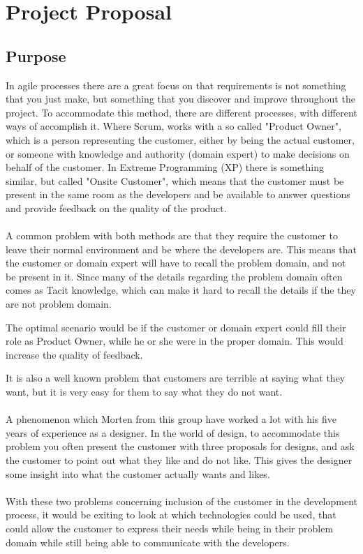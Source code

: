 \section{Project Proposal}
\subsection{Purpose}
In agile processes there are a great focus on that requirements is not something that you just make, but something that you discover and improve throughout the project.
To accommodate this method, there are different processes, with different ways of accomplish it. 
Where Scrum, works with a so called "Product Owner", which is a person representing the customer, either by being the actual customer, or someone with knowledge and authority (domain expert) to make decisions on behalf of the customer. 
In Extreme Programming (XP) there is something similar, but called "Onsite Customer", which means that the customer must be present in the same room as the developers and be available to answer questions and provide feedback on the quality of the product. 
\\\\
A common problem with both methods are that they require the customer to leave their normal environment and be where the developers are. 
This means that the customer or domain expert will have to recall the problem domain, and not be present in it.
Since many of the details regarding the problem domain often comes as Tacit knowledge, which can make it hard to recall the details if the they are not problem domain. 

The optimal scenario would be if the customer or domain expert could fill their role as Product Owner, while he or she were in the proper domain. 
This would increase the quality of feedback.

It is also a well known problem that customers are terrible at saying what they want, but it is very easy for them to say what they do not want.
\\\\
A phenomenon which Morten from this group have worked a lot with his five years of experience as a designer.
In the world of design, to accommodate this problem you often present the customer with three proposals for designs, and ask the customer to point out what they like and do not like.
This gives the designer some insight into what the customer actually wants and likes. 
\\\\
With these two problems concerning inclusion of the customer in the development process, it would be exiting to look at which technologies could be used, that could allow the customer to express their needs while being in their problem domain while still being able to communicate with the developers. 

